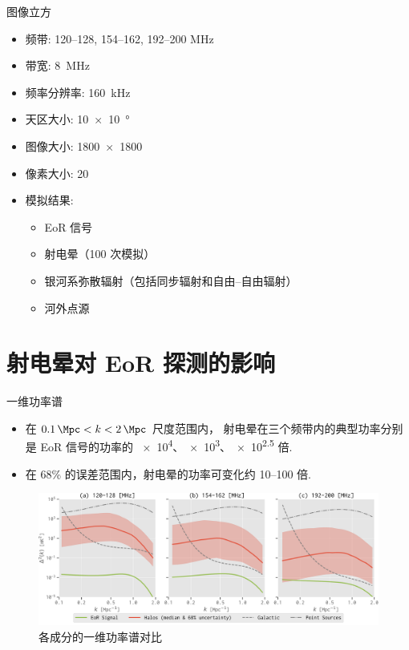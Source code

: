 \documentclass{beamer}
\begin{document}
\begin{frame}{图像立方}
  \begin{itemize}
    \item 频带: 120--128, 154--162, 192--200 MHz
    \item 带宽: \SI{8}{\MHz}
    \item 频率分辨率: \SI{160}{\kHz}
    \item 天区大小: \SI{10 x 10}{\degree}
    \item 图像大小: \num{1800 x 1800}
    \item 像素大小: \SI{20}{\arcsec}
    \item 模拟结果:
      \begin{itemize}
        \item EoR 信号
        \item 射电晕（100 次模拟）
        \item 银河系弥散辐射（包括同步辐射和自由–自由辐射）
        \item 河外点源
      \end{itemize}
  \end{itemize}
\end{frame}


\section{射电晕对 EoR 探测的影响}

\begin{frame}{一维功率谱}
  \begin{itemize}
    \item 在 $\SI{0.1}{\per\Mpc} < k < \SI{2}{\per\Mpc}$ 尺度范围内，
      射电晕在三个频带内的典型功率分别是 EoR 信号的功率的
      \num{e4}、\num{e3}、\num{e2.5} 倍.
    \item 在 68\% 的误差范围内，射电晕的功率可变化约 \numrange{10}{100} 倍.
  \end{itemize}

  \begin{figure}
    \centering
    \includegraphics[width=\textwidth]{ps1d-3bands}
    \caption{各成分的一维功率谱对比}
  \end{figure}
\end{frame}
\end{document}
